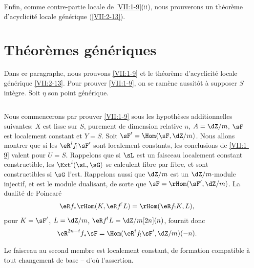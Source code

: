 Enfin, comme contre-partie locale de \ref{VII:1-9}(ii), nous prouverons un 
théorème d'acyclicité locale générique (\ref{VII:2-13}). 










\section{Théorèmes génériques}\label{VII:2}

Dans ce paragraphe, nous prouvons \ref{VII:1-9} et le théorème 
d'acyclicité locale générique \ref{VII:2-13}. Pour prouver \ref{VII:1-9}, 
on se ramène aussitôt à supposer $S$ intègre. Soit $\eta$ son point 
générique. 





\subsection{}\label{VII:2-1}

Nous commencerons par prouver \ref{VII:1-9} sous les hypothèses 
additionnelles suivantes: $X$ est lisse sur $S$, purement de dimension relative 
$n$, $A=\dZ/m$, $\sF$ est localement constant et $Y=S$. Soit 
$\sF'=\Hom(\sF,\dZ/m)$. Nous allons montrer que si les $\eR^i f_! \sF'$ sont 
localement constants, les conclusions de \ref{VII:1-9} valent pour $U=S$. 
Rappelons que si $\sL$ est un faisceau localement constant constructible, les 
$\Ext^i(\sL,\sG)$ se calculent fibre par fibre, et sont constructibles si $\sG$ 
l'est. Rappelons aussi que $\dZ/m$ est un $\dZ/m$-module injectif, et est le 
module dualisant, de sorte que $\sF=\rHom(\sF',\dZ/m)$. La dualité de 
Poincaré 
\[
  \eR f_\ast \rHom(K,\eR f^! L) = \rHom(\eR f_! K,L) \text{,} 
\]
pour $K=\sF'$, $L=\dZ/m$, $\eR f^! L = \dZ/m[2n](n)$, fournit donc 
\[
  \eR^{2n-i} f_\ast \sF = \Hom(\eR^i f_! \sF',\dZ/m)(-n) \text{.} 
\]

Le faisceau au second membre est localement constant, de formation compatible 
à tout changement de base -- d'où l'assertion. 





\subsection{}\label{VII:2-2}

